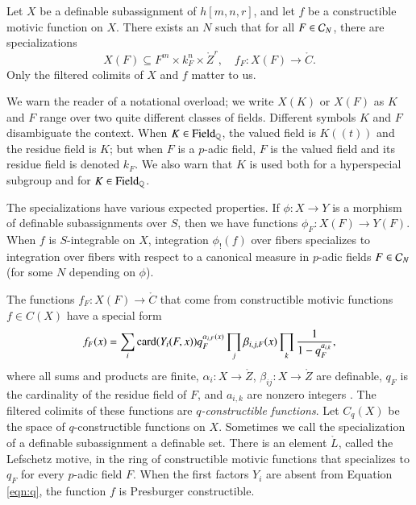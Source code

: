 Let $X$ be a definable subassignment of $h[m,n,r]$, and let $f$ be a
constructible motivic function on $X$.  There exists an $N$ such that
for all $F\in \mathcal C_N$, there are specializations
\[
X(F)\subseteq F^m\times k_F^n\times \ring{Z}^r,  
\quad f_F: X(F) \to\ring{C}.
\]
Only the  filtered colimits of $X$ and $f$ matter to us.

We warn the reader of a notational overload; we write $X(K)$ or $X(F)$
as $K$ and $F$ range over two quite different classes of fields.
Different symbols $K$ and $F$ disambiguate the context.  When $K\in
{\operatorname{Field}}_{\mathbb{Q}}$, the valued field is $K((t))$ and the residue field is
$K$; but when $F$ is a $p$-adic field, $F$ is the valued field and its
residue field is denoted $k_F$.  We also warn that $K$ is used both
for a hyperspecial subgroup and for $K\in{\operatorname{Field}}_{\mathbb{Q}}$.

The specializations have various expected properties.  If $\phi:X\to
Y$ is a morphism of definable subassignments over $S$, then we have
functions $\phi_F:X(F)\to Y(F)$.  When $f$ is $S$-integrable on $X$,
integration $\phi_!(f)$ over fibers specializes to integration over
fibers with respect to a canonical measure in $p$-adic fields $F\in
\mathcal C_N$ (for some $N$ depending on $\phi$).

The functions $f_F:X(F)\to\ring{C}$ that come from constructible
motivic functions $f\in C(X)$ have a special form
\begin{equation}\label{eqn:q}
f_F(x) = \sum_i {\operatorname{card}}(Y_i(F,x)) q_F^{\alpha_{i,F}(x)} 
\prod_j \beta_{i,j,F}(x)\prod_k \frac{1}{1-q_F^{a_{i,k}}},
\end{equation}
where all sums and products are finite, $\alpha_{i}:X\to\ring{Z}$,
$\beta_{ij}:X\to\ring{Z}$ are definable, $q_F$ is the cardinality of
the residue field of $F$, and $a_{i,k}$ are nonzero integers
\cite[\S2]{cluckers2011btransfer}.  The filtered colimits of these
functions are {\it $q$-constructible functions}.  Let $C_q(X)$ be the
space of $q$-constructible functions on $X$.  Sometimes we call the
specialization of a definable subassignment a definable set.  There is
an element $\ring{L}$, called the Lefschetz motive, in the ring of
constructible motivic functions that specializes to $q_F$ for every
$p$-adic field $F$.  When the first factors $Y_i$ are absent from
Equation \ref{eqn:q}, the function $f$ is Presburger constructible.

